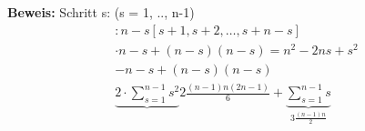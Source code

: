 \textbf{Beweis:}
Schritt s: (s = 1, .., n-1)
\begin{equation*}
  \begin{aligned}
	  : n-s [s+1, s+2, \ldots, s+n - s] \\
		\cdot n-s + (n-s)(n-s) = n^2 - 2ns +s^2 \\
		- n-s + (n-s)(n-s) \\
		\hline
		\underbrace{2 \cdot \sum\limits_{s=1}^{n-1}{s^2}}{2 \frac{(n-1)n(2n-1)}{6}}+\underbrace{\sum\limits_{s=1}^{n-1}{s}}_{3\frac{(n-1)n}{2}}
	\end{aligned}
\end{equation*}